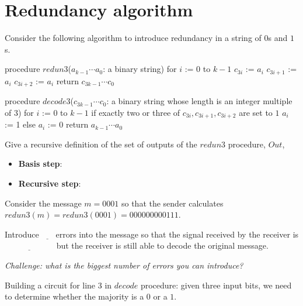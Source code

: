 \documentclass[12pt, oneside]{article}
\begin{document}
\section*{Redundancy algorithm}


Consider the following algorithm to introduce redundancy in a string of $0$s and $1$s.
\begin{algorithm}[caption={Create redundancy by repeating each bit three times}]
procedure $\textit{redun3}$($a_{k-1} \cdots a_0$: a binary string)
for $i$ := $0$ to $k-1$
  $c_{3i}$ := $a_i$
  $c_{3i+1}$ := $a_i$
  $c_{3i+2}$ := $a_i$
return $c_{3k-1} \cdots c_0$
\end{algorithm}

\begin{algorithm}[caption={Decode sequence of bits using majority rule on consecutive three bit sequences}]
procedure $\textit{decode3}$($c_{3k-1} \cdots c_0$: a binary string whose length is an integer multiple of $3$)
for $i$ := $0$ to $k-1$
  if exactly two or three of $c_{3i}, c_{3i+1}, c_{3i+2}$ are set to $1$
    $a_i$ := 1
  else 
    $a_i$ := 0
return $a_{k-1} \cdots a_0$
\end{algorithm}

Give a recursive definition of the set of outputs of the $redun3$ procedure, $Out$,

\vspace{-20pt}

\begin{itemize}
\item[] {\bf Basis step}: \underline{ \phantom{$\lambda \in Out$ \qquad}}
\item[] {\bf Recursive step}: \underline{\phantom{If $x \in Out$ then $x000 \in Out$ and $x111 \in Out$} }
\end{itemize}


Consider the message $m = 0001$ so that the sender calculates $redun3(m) = redun3(0001) = 000000000111$.

Introduce $\underline{\phantom{~~4~~}} $
errors into the message so that the signal received by the 
receiver is $\underline{\phantom{010100010101}}$
but the receiver is still able to decode the original message.

\vspace{-10pt}

{\it Challenge: what is the biggest number of errors you can introduce?} 

Building a circuit for line 3 in $decode$ procedure: given three input bits, we need to determine whether the
majority is a $0$ or a $1$.
\end{document}
